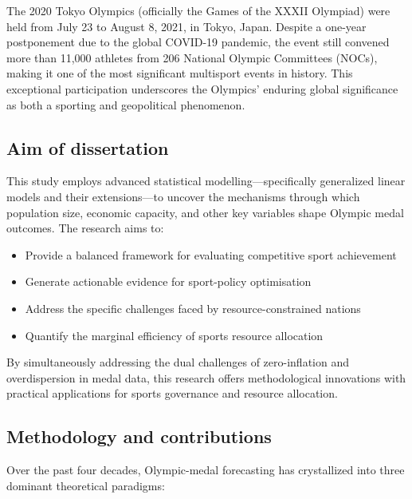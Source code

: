 \documentclass[11pt,twoside]{article}
\numberwithin{Theorem}{section}
\numberwithin{Definition}{section}
\numberwithin{Lemma}{section}
\numberwithin{Algorithm}{section}
\numberwithin{equation}{section}
\begin{document}
The 2020 Tokyo Olympics (officially the Games of the XXXII Olympiad) were held from July 23 to August 8, 2021, in Tokyo, Japan. Despite a one-year postponement due to the global COVID-19 pandemic, the event still convened more than 11,000 athletes from 206 National Olympic Committees (NOCs), making it one of the most significant multisport events in history. This exceptional participation underscores the Olympics' enduring global significance as both a sporting and geopolitical phenomenon.

\subsection{Aim of dissertation}
\label{subsec:significance}

This study employs advanced statistical modelling—specifically generalized linear models and their extensions—to uncover the mechanisms through which population size, economic capacity, and other key variables shape Olympic medal outcomes. The research aims to:

\begin{itemize}
    \item Provide a balanced framework for evaluating competitive sport achievement
    \item Generate actionable evidence for sport-policy optimisation
    \item Address the specific challenges faced by resource-constrained nations
    \item Quantify the marginal efficiency of sports resource allocation
\end{itemize}

By simultaneously addressing the dual challenges of zero-inflation and overdispersion in medal data, this research offers methodological innovations with practical applications for sports governance and resource allocation.

\subsection{Methodology and contributions}
\label{subsec:literature}

Over the past four decades, Olympic-medal forecasting has crystallized into three dominant theoretical paradigms:
\end{document}
